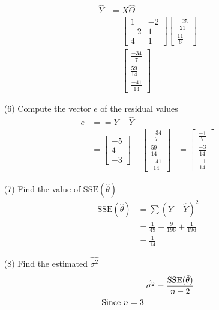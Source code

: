 \documentclass[12pt,a4paper]{article}
\begin{document}
\begin{enumerate}
		\begin{align*}
			\hat{Y}  &=  X\hat{\Theta}\\
				&= \begin{bmatrix}
								1 & -2 \\
								-2 & 1\\
							4 & 1
						\end{bmatrix}  \begin{bmatrix}
			\frac{-25}{21}\\
			\frac{11}{6}
	\end{bmatrix}\\
	 &=  \begin{bmatrix}
			\frac{-34}{7}\\
			\frac{59}{14}\\
			\frac{-41}{14}
	\end{bmatrix}
		\end{align*}
	\item[(6)] Compute the vector $e $ of the residual values
	\begin{align*}
			e &= = Y - \hat{Y} \\
			&=   \begin{bmatrix}
			-5 \\
			4\\
			-3
	\end{bmatrix} - \begin{bmatrix}
			\frac{-34}{7}\\
			\frac{59}{14}\\
			\frac{-41}{14}
	\end{bmatrix}
	&=  \begin{bmatrix}
			\frac{-1}{7}\\
			\frac{-3}{14}\\
			\frac{-1}{14}
	\end{bmatrix}
	\end{align*}
	\item[(7)] Find the value of $\text{SSE}(\hat{\theta})$
		\begin{align*}
					\text{SSE}(\hat{\theta}) &=  \sum(Y - \hat{Y})^2\\
					&=  \frac{1}{49} + \frac{9}{196} + \frac{1}{196} \\
					&= \frac{1}{14}
		\end{align*}
	\item[(8)]  Find the estimated $\hat{\sigma^2}$
		\begin{align*}
			\hat{\sigma^2} &=  \frac{\text{SSE}(\hat{\theta})}{n -2} \\
			\text{Since $n = 3$ \quad }   \\

\end{align*}
\end{enumerate}
\end{document}
